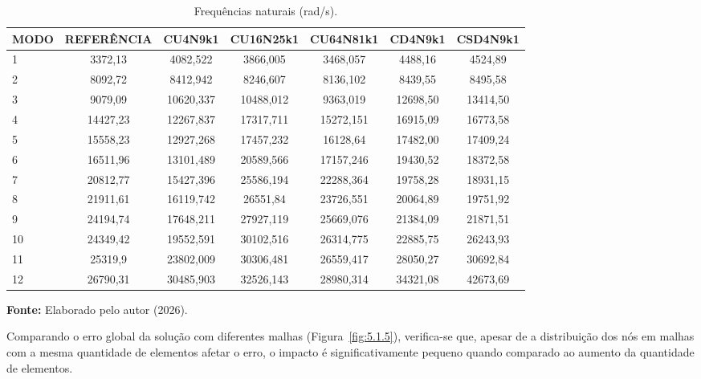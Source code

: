 \begin{table}[htbp]
    \centering
    \caption{Frequências naturais (rad/s).}
    \label{tab:5.a.2}
    \small %
    \begin{tabular}{lcccccc}
        \toprule
        \textbf{MODO} & \textbf{REFERÊNCIA} & \textbf{CU4N9k1} & \textbf{CU16N25k1} & \textbf{CU64N81k1} & \textbf{CD4N9k1} & \textbf{CSD4N9k1} \\
        \midrule
        1  & 3372,13 & 4082,522  & 3866,005  & 3468,057  & 4488,16  & 4524,89  \\
        2  & 8092,72 & 8412,942  & 8246,607  & 8136,102  & 8439,55  & 8495,58  \\
        3  & 9079,09 & 10620,337 & 10488,012 & 9363,019  & 12698,50 & 13414,50 \\
        4  & 14427,23 & 12267,837 & 17317,711 & 15272,151 & 16915,09 & 16773,58 \\
        5  & 15558,23 & 12927,268 & 17457,232 & 16128,64  & 17482,00 & 17409,24 \\
        6  & 16511,96 & 13101,489 & 20589,566 & 17157,246 & 19430,52 & 18372,58 \\
        7  & 20812,77 & 15427,396 & 25586,194 & 22288,364 & 19758,28 & 18931,15 \\
        8  & 21911,61 & 16119,742 & 26551,84  & 23726,551 & 20064,89 & 19751,92 \\
        9  & 24194,74 & 17648,211 & 27927,119 & 25669,076 & 21384,09 & 21871,51 \\
        10 & 24349,42 & 19552,591 & 30102,516 & 26314,775 & 22885,75 & 26243,93 \\
        11 & 25319,9  & 23802,009 & 30306,481 & 26559,417 & 28050,27 & 30692,84 \\
        12 & 26790,31 & 30485,903 & 32526,143 & 28980,314 & 34321,08 & 42673,69 \\
        \bottomrule
    \end{tabular}
    
    \vspace{0.2cm}
    \raggedright
    \textbf{Fonte:} Elaborado pelo autor (2026).
\end{table}

\indent Comparando o erro global da solução com diferentes malhas (Figura~\ref{fig:5.1.5}), verifica-se que, apesar de a distribuição dos nós em malhas com a mesma quantidade de elementos afetar o erro, o impacto é significativamente pequeno quando comparado ao aumento da quantidade de elementos.

